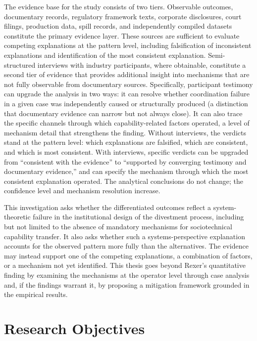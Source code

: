 The evidence base for the study consists of two tiers. Observable
outcomes, documentary records, regulatory framework texts, corporate
disclosures, court filings, production data, spill records, and
independently compiled datasets constitute the primary evidence layer.
These sources are sufficient to evaluate competing explanations at the
pattern level, including falsification of inconsistent explanations and
identification of the most consistent explanation. Semi-structured
interviews with industry participants, where obtainable, constitute a
second tier of evidence that provides additional insight into mechanisms
that are not fully observable from documentary sources. Specifically,
participant testimony can upgrade the analysis in two ways: it can
resolve whether coordination failure in a given case was independently
caused or structurally produced (a distinction that documentary evidence
can narrow but not always close). It can also trace the specific
channels through which capability-related factors operated, a level of
mechanism detail that strengthens the finding. Without interviews, the
verdicts stand at the pattern level: which explanations are falsified,
which are consistent, and which is most consistent. With interviews,
specific verdicts can be upgraded from ``consistent with the evidence''
to ``supported by converging testimony and documentary evidence,'' and
can specify the mechanism through which the most consistent explanation
operated. The analytical conclusions do not change; the confidence level
and mechanism resolution increase.

This investigation asks whether the differentiated outcomes reflect a
system-theoretic failure in the institutional design of the divestment
process, including but not limited to the absence of mandatory
mechanisms for sociotechnical capability transfer. It also asks whether
such a systems-perspective explanation accounts for the observed pattern
more fully than the alternatives. The evidence may instead support one
of the competing explanations, a combination of factors, or a mechanism
not yet identified. This thesis goes beyond Rexer's quantitative finding
by examining the mechanisms at the operator level through case analysis
and, if the findings warrant it, by proposing a mitigation framework
grounded in the empirical results.

\hypertarget{research-objectives}{%
\section{Research Objectives}\label{research-objectives}}

